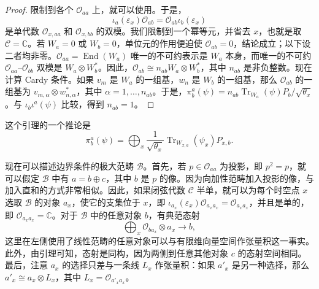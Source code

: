 \begin{proof}
限制到各个 $\mathcal{O}_{aa}$ 上，就可以使用。于是，
\[
\iota_a(\varepsilon_x)\mathcal{O}_{ab}=\mathcal{O}_{ab}\iota_b(\varepsilon_x)
\]
是单代数 $\mathcal{O}_{x,aa}$ 和 $\mathcal{O}_{x,bb}$ 的双模。我们限制到一个幂等元，并省去 $x$，也就是取 $\mathcal{C}=\mathbb{C}$。若 $W_a=0$ 或 $W_b=0$，单位元的作用便迫使 $\mathcal{O}_{ab}=0$，结论成立；以下设二者均非零。$\mathcal{O}_{aa}=\operatorname{End}(W_a)$ 唯一的不可约表示是 $W_a$ 本身，而唯一的不可约 $\mathcal{O}_{aa}$--$\mathcal{O}_{bb}$ 双模是 $W_a\otimes W_b^*$。因此，$\mathcal{O}_{ab}\cong n_{ab}W_a\otimes W_b^*$，其中 $n_{ab}$ 是非负整数。现在计算 Cardy 条件。如果 $v_m$ 是 $W_a$ 的一组基，$w_n$ 是 $W_b$ 的一组基，那么 $\mathcal{O}_{ab}$ 的一组基为 $v_{m,\alpha}\otimes w_{n,\alpha}^*$，其中 $\alpha=1,\ldots,n_{ab}$。于是，$\pi_b^a(\psi)=n_{ab}\operatorname{Tr}_{W_a}(\psi)P_b/\sqrt{\theta_x}$。与 $\iota_b\iota^a(\psi)$ 比较，得到 $n_{ab}=1$。\BookQED
\end{proof}

这个引理的一个推论是
\begin{equation}\label{eq:2.38}
\pi_b^a(\psi)=\bigoplus_x\frac{1}{\sqrt{\theta_x}}\operatorname{Tr}_{W_{x,a}}(\psi_x)P_{x,b}.
\end{equation}

现在可以描述边界条件的极大范畴 $\mathcal{B}$。首先，若 $p\in\mathcal{O}_{aa}$ 为投影，即 $p^2=p$，就可以假定 $\mathcal{B}$ 中有 $a=b\oplus c$，其中 $b$ 是 $p$ 的像。因为向加性范畴加入投影的像，与加入直和的方式非常相似。因此，如果闭弦代数 $\mathcal{C}$ 半单，就可以为每个时空点 $x$ 选取 $\mathcal{B}$ 的对象 $a_x$，使它的支集位于 $x$，即 $\iota_{a_x}(\varepsilon_x)\mathcal{O}_{a_xa_x}=\mathcal{O}_{a_xa_x}$，并且是单的，即 $\mathcal{O}_{a_xa_x}=\mathbb{C}$。对于 $\mathcal{B}$ 中的任意对象 $b$，有典范态射
\begin{equation}\label{eq:2.39}
\bigoplus_x\mathcal{O}_{ba_x}\otimes a_x\longrightarrow b,
\end{equation}
这里在左侧使用了线性范畴的任意对象可以与有限维向量空间作张量积这一事实。此外，由引理可知，态射是同构，因为两侧到任意其他对象 $c$ 的态射空间相同。最后，注意 $a_x$ 的选择只差与一条线 $L_x$ 作张量积：如果 $a'_x$ 是另一种选择，那么 $a'_x\cong a_x\otimes L_x$，其中 $L_x=\mathcal{O}_{a'_xa_x}$。

